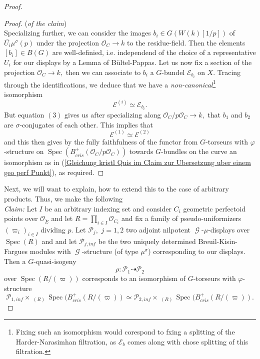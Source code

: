 \documentclass[a4paper,10,5 pt]{amsart}
\theoremstyle{definition}
\DeclareMathOperator{\Spec}{Spec}
\DeclareMathOperator{\Ainf}{\mathbb{A}_{inf}}
\DeclareMathOperator{\G}{\mathcal{G}}
\begin{document}
\begin{proof}
\begin{proof}{(\textit{of the claim})}
\begin{equation}
\end{equation}
Specializing further, we can consider the images $b_{i}\in G(W(k)[1/p])$ of $\bar{U_{i}}\mu^{\sigma}(p)$ under the projection $\mathcal{O}_{C}\rightarrow k$ to the residue-field. Then the elements $[b_{i}]\in B(G)$ are well-definied, i.e. independend of the choice of a representative $U_{i}$ for our displays by a Lemma of Bültel-Pappas. Let us now fix a section of the projection $\mathcal{O}_{C}\rightarrow k,$ then we can associate to $b_{i}$ a $G$-bundel $\mathcal{E}_{b_{i}}$ on $X.$ Tracing through the identifications, we deduce that we have a \textit{non-canonical}\footnote{Fixing such an isomorphism would corespond to fxing a splitting of the Harder-Narasimhan filtration, as $\mathcal{E}_{b}$ comes along with chose splitting of this filtration.} isomorphism
$$
\mathcal{E}^{(i)}\simeq \mathcal{E}_{b_{i}}.
$$
But equation $(3)$ gives us after specializing along $\mathcal{O}_{C}/p\mathcal{O}_{C}\rightarrow k,$ that $b_{1}$ and $b_{2}$ are $\sigma$-conjugates of each other. This implies that
$$
\mathcal{E}^{(1)}\simeq \mathcal{E}^{(2)}
$$ 
and this then gives by the fully faithfulness of the functor from $G$-torseurs with $\varphi$-structure on $\Spec(B^{+}_{cris}(\mathcal{O}_{C}/p\mathcal{O}_{C}))$ towards $G$-bundles on the curve an isomorphism as in (\ref{Gleichung kristl Quis im Claim zur Ubersetzung uber einem geo perf Punkt}), as required.
\end{proof}
Next, we will want to explain, how to extend this to the case of arbitrary products. Thus, we make the following
\\
\textit{Claim:} Let $I$ be an arbitrary indexing set and consider $C_{i}$ geometric perfectoid points over $\mathcal{O}_{\breve{E}}$ and let $R=\prod_{i\in I}\mathcal{O}_{C_{i}}$ and fix a family of pseudo-uniformizers $(\varpi_{i})_{i \in I}$ dividing $p.$ Let $\mathcal{P}_{j},$ $j=1,2$ two adjoint nilpotent $\G$-$\mu$-displays over $\Spec(R)$ and and let $\mathcal{P}_{j,inf}$ be the two uniquely determined Breuil-Kisin-Fargues modules with $\G$-structure (of type $\mu^{\sigma}$) corresponding to our displays.
\\
Then a $G$-quasi-isogeny
\begin{equation}
\rho\colon \mathcal{P}_{1}\dashrightarrow \mathcal{P}_{2}
\end{equation}
over $\Spec(R/(\varpi))$ corresponds to an isomorphism of $G$-torseurs with $\varphi$-structure
\begin{equation}
\mathcal{P}_{1,inf}\times_{\Ainf(R)} \Spec(B^{+}_{cris}(R/(\varpi))\simeq \mathcal{P}_{2,inf}\times_{\Ainf(R)} \Spec(B^{+}_{cris}(R/(\varpi)).

\end{equation}
\end{proof}
\end{document}
